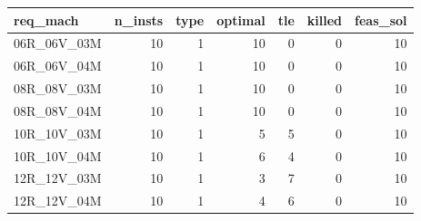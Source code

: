 
\begin{tabular}{lrrrrrr}
\toprule
req\_mach & n\_insts & type & optimal & tle & killed & feas\_sol\\
\midrule
06R\_06V\_03M & 10 & 1 & 10 & 0 & 0 & 10\\
06R\_06V\_04M & 10 & 1 & 10 & 0 & 0 & 10\\
08R\_08V\_03M & 10 & 1 & 10 & 0 & 0 & 10\\
08R\_08V\_04M & 10 & 1 & 10 & 0 & 0 & 10\\
10R\_10V\_03M & 10 & 1 & 5 & 5 & 0 & 10\\
\addlinespace
10R\_10V\_04M & 10 & 1 & 6 & 4 & 0 & 10\\
12R\_12V\_03M & 10 & 1 & 3 & 7 & 0 & 10\\
12R\_12V\_04M & 10 & 1 & 4 & 6 & 0 & 10\\
\bottomrule
\end{tabular}
